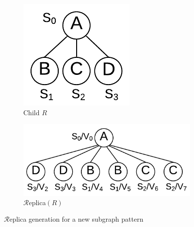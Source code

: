 \begin{figure}[t]
	\begin{subfigure}[b]{0.15\textwidth}
		\hspace{4mm}\includegraphics[scale=0.5]{img_ex/patternR.pdf}
		\caption{Child $R$}
		\label{fig:exact-R}
	\end{subfigure}%
	\hspace*{\fill}
	\begin{subfigure}[b]{0.3\textwidth}
		\hspace{0mm}\includegraphics[scale=0.5]{img_ex/replicaR.pdf}
		\vspace{-0.25mm}
		\caption{$\mathcal{R}$eplica$(R)$}
		\label{fig:exact-REPR}
	\end{subfigure}
	\caption{$\mathcal{R}$eplica generation for a new subgraph pattern}
	\label{fig:exact-EX}
\end{figure}
%
%
